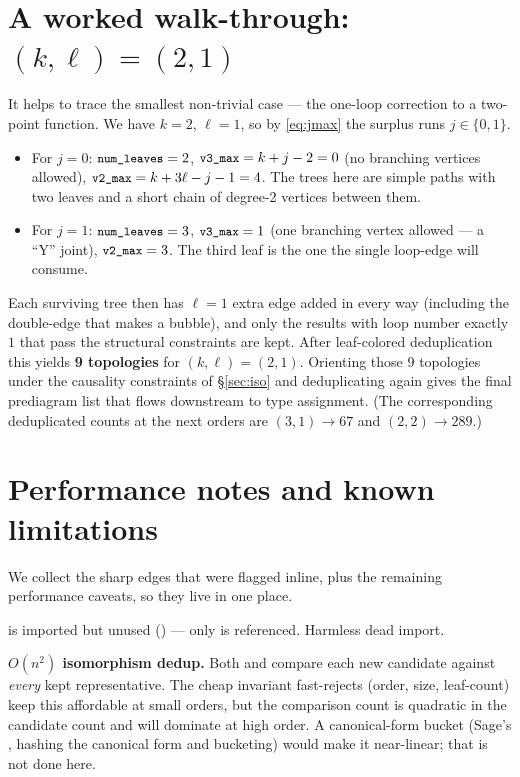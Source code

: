 \section{A worked walk-through: \texorpdfstring{$(k,\ell)=(2,1)$}{(k,l)=(2,1)}}

It helps to trace the smallest non-trivial case --- the one-loop correction to a
two-point function. We have $k=2$, $\ell=1$, so by \eqref{eq:jmax} the surplus
runs $j\in\{0,1\}$.

\begin{itemize}
  \item For $j=0$: $\texttt{\small num\_leaves}=2$, $\texttt{\small v3\_max}=k+j-2=0$ (no branching
        vertices allowed), $\texttt{\small v2\_max}=k+3\ell-j-1=4$. The trees here are
        simple paths with two leaves and a short chain of degree-2 vertices
        between them.
  \item For $j=1$: $\texttt{\small num\_leaves}=3$, $\texttt{\small v3\_max}=1$ (one branching
        vertex allowed --- a ``Y'' joint), $\texttt{\small v2\_max}=3$. The third leaf is
        the one the single loop-edge will consume.
\end{itemize}

Each surviving tree then has $\ell=1$ extra edge added in every
 way (including the double-edge that makes a
bubble), and only the results with loop number exactly $1$ that pass the
structural constraints are kept. After leaf-colored deduplication this yields
\textbf{9 topologies} for $(k,\ell)=(2,1)$. Orienting those 9 topologies under the
causality constraints of \S\ref{sec:iso} and deduplicating again gives the final
prediagram list that flows downstream to type assignment. (The corresponding
deduplicated counts at the next orders are $(3,1)\to 67$ and $(2,2)\to 289$.)

\section{Performance notes and known limitations}

We collect the sharp edges that were flagged inline, plus the remaining
performance caveats, so they live in one place.

\begin{gotcha}
\label{gotcha:deadimport}
 is imported but unused () ---
only  is referenced. Harmless dead import.
\end{gotcha}

\begin{gotcha}
\label{gotcha:on2}
\textbf{$O(n^2)$ isomorphism dedup.} Both 
and  compare each new candidate against
\emph{every} kept representative. The cheap invariant fast-rejects (order, size,
leaf-count) keep this affordable at small orders, but the comparison count is
quadratic in the candidate count and will dominate at high order. A canonical-form
bucket (Sage's , hashing the canonical form and
bucketing) would make it near-linear; that is not done here.
\end{gotcha}

